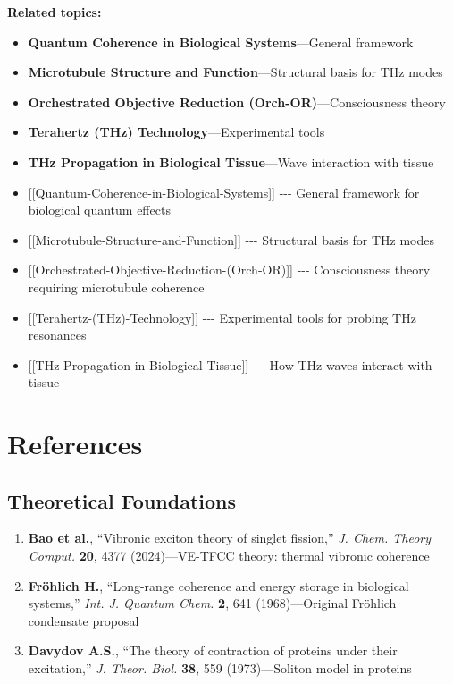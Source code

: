 \textbf{Related topics:}
\begin{itemize}
\item \textbf{Quantum Coherence in Biological Systems}---General framework
\item \textbf{Microtubule Structure and Function}---Structural basis for THz modes
\item \textbf{Orchestrated Objective Reduction (Orch-OR)}---Consciousness theory
\item \textbf{Terahertz (THz) Technology}---Experimental tools
\item \textbf{THz Propagation in Biological Tissue}---Wave interaction with tissue
\end{itemize}

\begin{itemize}
\tightlist
\item
  {[}{[}Quantum-Coherence-in-Biological-Systems{]}{]} -\/-\/- General
  framework for biological quantum effects
\item
  {[}{[}Microtubule-Structure-and-Function{]}{]} -\/-\/- Structural
  basis for THz modes
\item
  {[}{[}Orchestrated-Objective-Reduction-(Orch-OR){]}{]} -\/-\/-
  Consciousness theory requiring microtubule coherence
\item
  {[}{[}Terahertz-(THz)-Technology{]}{]} -\/-\/- Experimental tools for
  probing THz resonances
\item
  {[}{[}THz-Propagation-in-Biological-Tissue{]}{]} -\/-\/- How THz waves
  interact with tissue
\end{itemize}

\section{References}

\subsection*{Theoretical Foundations}

\begin{enumerate}
\item \textbf{Bao et al.}, ``Vibronic exciton theory of singlet fission,'' \emph{J. Chem. Theory Comput.} \textbf{20}, 4377 (2024)---VE-TFCC theory: thermal vibronic coherence
\item \textbf{Fröhlich H.}, ``Long-range coherence and energy storage in biological systems,'' \emph{Int. J. Quantum Chem.} \textbf{2}, 641 (1968)---Original Fröhlich condensate proposal
\item \textbf{Davydov A.S.}, ``The theory of contraction of proteins under their excitation,'' \emph{J. Theor. Biol.} \textbf{38}, 559 (1973)---Soliton model in proteins
\end{enumerate}

